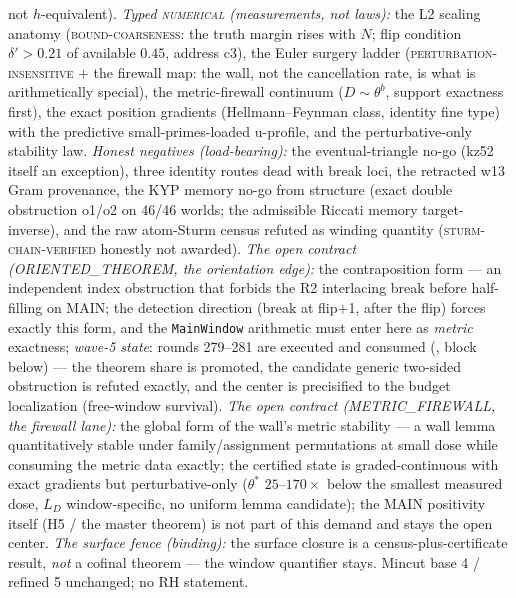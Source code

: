 \documentclass[11pt,a4paper]{article}
\begin{document}
{not $h$-equivalent).  \emph{Typed \textsc{numerical}
(measurements, not laws):} the L2 scaling anatomy
(\textsc{bound-coarseness}: the truth margin rises with $N$; flip
condition $\delta' > 0.21$ of available $0.45$, address c3), the
Euler surgery ladder (\textsc{perturbation-insensitive} $+$ the
firewall map: the wall, not the cancellation rate, is what is
arithmetically special), the metric-firewall continuum
($D \sim \theta^b$, support exactness first), the exact position
gradients (Hellmann--Feynman class, identity fine type) with the
predictive small-primes-loaded u-profile, and the
perturbative-only stability law.  \emph{Honest negatives
(load-bearing):} the eventual-triangle no-go (kz52 itself an
exception), three identity routes dead with break loci, the
retracted w13 Gram provenance, the KYP memory no-go from
structure (exact double obstruction o1/o2 on 46/46 worlds; the
admissible Riccati memory target-inverse), and the raw atom-Sturm
census refuted as winding quantity
(\textsc{sturm-chain-verified} honestly not awarded).  \emph{The
open contract (ORIENTED\_THEOREM, the orientation edge):} the
contraposition form --- an independent index obstruction that
forbids the R2 interlacing break before half-filling on MAIN; the
detection direction (break at flip$+$1, after the flip) forces
exactly this form, and the \texttt{MainWindow} arithmetic must
enter here as \emph{metric} exactness; \emph{wave-5 state}:
rounds 279--281 are executed and consumed
(, block below) ---
the theorem share is promoted, the candidate generic two-sided
obstruction is refuted exactly, and the center is precisified to
the budget localization (free-window survival).  \emph{The open contract (METRIC\_FIREWALL, the
firewall lane):} the global form of the wall's metric stability
--- a wall lemma quantitatively stable under family/assignment
permutations at small dose while consuming the metric data
exactly; the certified state is graded-continuous with exact
gradients but perturbative-only ($\theta^*$ $25$--$170\times$
below the smallest measured dose, $L_D$ window-specific, no
uniform lemma candidate); the MAIN positivity itself (H5 / the
master theorem) is not part of this demand and stays the open
center.  \emph{The surface fence (binding):} the surface closure
is a census-plus-certificate result, \emph{not} a cofinal theorem
--- the window quantifier stays.  Mincut base 4 / refined 5
unchanged; no RH statement.\par}
\end{document}
